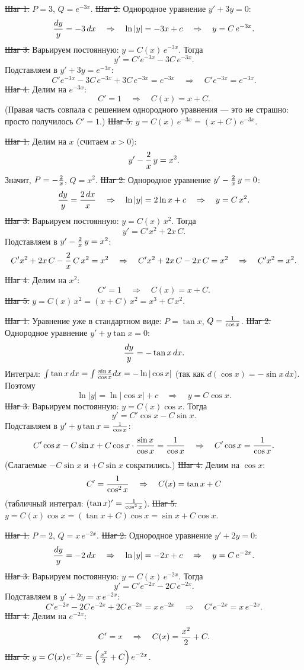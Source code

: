 \st{Шаг 1.} $P=3$, $Q=e^{-3x}$.
\st{Шаг 2.} Однородное уравнение $y'+3y=0$:
$${dy\over y}=-3\,dx\quad\Rightarrow\quad\ln|y|=-3x+c
\quad\Rightarrow\quad y=C\,e^{-3x}.$$
\st{Шаг 3.} Варьируем постоянную: $y=C(x)\,e^{-3x}$. Тогда
$$y'=C'e^{-3x}-3C\,e^{-3x}.$$
Подставляем в $y'+3y=e^{-3x}$:
$$C'e^{-3x}-3C\,e^{-3x}+3C\,e^{-3x}=e^{-3x}\quad\Rightarrow\quad
C'e^{-3x}=e^{-3x}.$$
\st{Шаг 4.} Делим на $e^{-3x}$:
$$C'=1\quad\Rightarrow\quad C(x)=x+C.$$
(Правая часть совпала с решением однородного уравнения --- это не страшно:
просто получилось $C'=1$.)
\st{Шаг 5.} $y=C(x)\,e^{-3x}=(x+C)\,e^{-3x}$.

\st{Шаг 1.} Делим на $x$ (считаем $x>0$):
$$y'-{2\over x}\,y=x^2.$$
Значит, $P=-{2\over x}$, $Q=x^2$.
\st{Шаг 2.} Однородное уравнение $y'-{2\over x}\,y=0$:
$${dy\over y}={2\,dx\over x}\quad\Rightarrow\quad\ln|y|=2\ln x+c
\quad\Rightarrow\quad y=C\,x^2.$$
\st{Шаг 3.} Варьируем постоянную: $y=C(x)\,x^2$. Тогда
$$y'=C'x^2+2x\,C.$$
Подставляем в $y'-{2\over x}\,y=x^2$:
$$C'x^2+2x\,C-{2\over x}\,C\,x^2=x^2\quad\Rightarrow\quad
C'x^2+2x\,C-2x\,C=x^2\quad\Rightarrow\quad C'x^2=x^2.$$
\st{Шаг 4.} Делим на $x^2$:
$$C'=1\quad\Rightarrow\quad C(x)=x+C.$$
\st{Шаг 5.} $y=C(x)\,x^2=(x+C)\,x^2=x^3+C\,x^2$.

\st{Шаг 1.} Уравнение уже в стандартном виде:
$P=\tan x$, $Q={1\over\cos x}$.
\st{Шаг 2.} Однородное уравнение $y'+y\tan x=0$:
$${dy\over y}=-\tan x\,dx.$$
Интеграл: $\int\tan x\,dx=\int{\sin x\over\cos x}dx=-\ln|\cos x|$
(так как $d(\cos x)=-\sin x\,dx$). Поэтому
$$\ln|y|=\ln|\cos x|+c\quad\Rightarrow\quad y=C\cos x.$$
\st{Шаг 3.} Варьируем постоянную: $y=C(x)\cos x$. Тогда
$$y'=C'\cos x-C\sin x.$$
Подставляем в $y'+y\tan x={1\over\cos x}$:
$$C'\cos x-C\sin x+C\cos x\cdot{\sin x\over\cos x}={1\over\cos x}
\quad\Rightarrow\quad C'\cos x={1\over\cos x}.$$
(Слагаемые $-C\sin x$ и $+C\sin x$ сократились.)
\st{Шаг 4.} Делим на $\cos x$:
$$C'={1\over\cos^2x}\quad\Rightarrow\quad C(x)=\tan x+C$$
(табличный интеграл: $(\tan x)'={1\over\cos^2x}$).
\st{Шаг 5.} $y=C(x)\cos x=(\tan x+C)\cos x=\sin x+C\cos x$.

\st{Шаг 1.} $P=2$, $Q=x\,e^{-2x}$.
\st{Шаг 2.} Однородное уравнение $y'+2y=0$:
$${dy\over y}=-2\,dx\quad\Rightarrow\quad\ln|y|=-2x+c
\quad\Rightarrow\quad y=C\,e^{-2x}.$$
\st{Шаг 3.} Варьируем постоянную: $y=C(x)\,e^{-2x}$. Тогда
$$y'=C'e^{-2x}-2C\,e^{-2x}.$$
Подставляем в $y'+2y=x\,e^{-2x}$:
$$C'e^{-2x}-2C\,e^{-2x}+2C\,e^{-2x}=x\,e^{-2x}\quad\Rightarrow\quad
C'e^{-2x}=x\,e^{-2x}.$$
\st{Шаг 4.} Делим на $e^{-2x}$:
$$C'=x\quad\Rightarrow\quad C(x)={x^2\over2}+C.$$
\st{Шаг 5.} $y=C(x)\,e^{-2x}=\left({x^2\over2}+C\right)e^{-2x}$.

